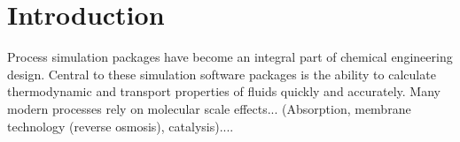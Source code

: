 \documentclass[12pt]{UoAthesis}
\begin{document}







\chapter{Introduction}

Process simulation packages have become an integral part of chemical
engineering design. Central to these simulation software packages is
the ability to calculate thermodynamic and transport properties of
fluids quickly and accurately. Many modern processes rely on molecular
scale effects... (Absorption, membrane technology (reverse osmosis),
catalysis)....
\end{document}
